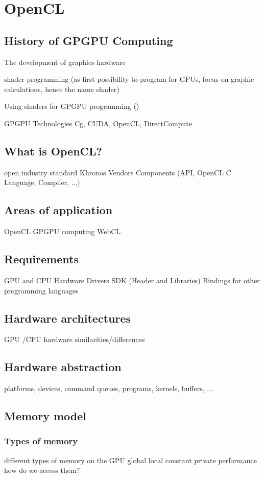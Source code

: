 \section{OpenCL}

\subsection{History of GPGPU Computing}
The development of graphics hardware

shader programming (as first possibility to program for GPUs, focus on graphic calculations, hence the name shader)

Using shaders for GPGPU programming ()

GPGPU Technologies
Cg, CUDA, OpenCL, DirectCompute

\subsection{What is OpenCL?}
open industry standard
Khronos
Vendors
Components (API, OpenCL C Language, Compiler, ...)

\subsection{Areas of application}
OpenCL
GPGPU computing
WebCL

\subsection{Requirements}
GPU and CPU Hardware
Drivers
SDK (Header and Libraries)
Bindings for other programming languages

\subsection{Hardware architectures}

GPU /CPU hardware
similarities/differences

\subsection{Hardware abstraction}
platforms, devices, command queues, programs, kernels, buffers, ...

\subsection{Memory model}

\subsubsection{Types of memory}
different types of memory on the GPU
global local constant private
performance
how do we access them?

